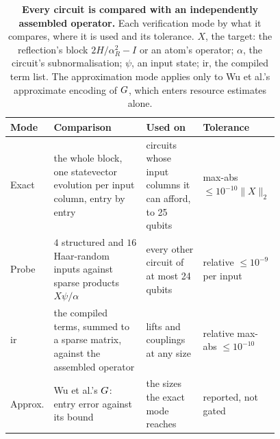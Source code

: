 \begin{table}[!htbp]
    \centering
    \caption[Operator verification modes and their tolerances]{\textbf{Every circuit is compared with an independently assembled operator.} Each verification mode by what it compares, where it is used and its tolerance. $X$, the target: the reflection's block $2H/\alpha_R^2-I$ or an atom's operator; $\alpha$, the circuit's subnormalisation; $\psi$, an input state; \gls{ir}, the compiled term list. The approximation mode applies only to Wu et al.'s approximate encoding of $G$, which enters resource estimates alone.}
    \label{tab:verification-modes}
    \small
    \begin{tabular}{@{}l p{0.37\linewidth} p{0.22\linewidth} p{0.19\linewidth}@{}}
        \toprule
        Mode & Comparison & Used on & Tolerance \\
        \midrule
        Exact & the whole block, one statevector evolution per input column, entry by entry & circuits whose input columns it can afford, to 25 qubits & max-abs $\le10^{-10}\|X\|_2$ \\
        Probe & $4$ structured and $16$ Haar-random inputs against sparse products $X\psi/\alpha$ & every other circuit of at most 24 qubits & relative $\le10^{-9}$ per input \\
        \gls{ir} & the compiled terms, summed to a sparse matrix, against the assembled operator & lifts and couplings at any size & relative max-abs $\le10^{-10}$ \\
        Approx. & Wu et al.'s $G$: entry error against its bound & the sizes the exact mode reaches & reported, not gated \\
        \bottomrule
    \end{tabular}
\end{table}

